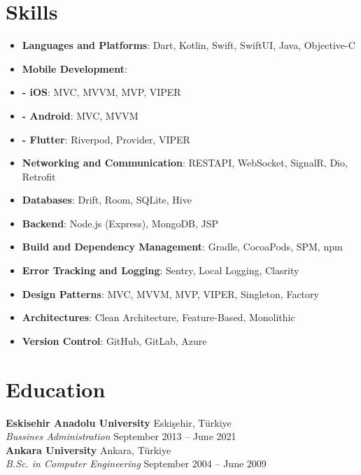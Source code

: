 \documentclass[11pt,a4paper]{extarticle}
\begin{document}
\section{Skills}
\begin{itemize}[leftmargin=*,noitemsep,topsep=0pt]
    \item \textbf{Languages and Platforms}: Dart, Kotlin, Swift, SwiftUI, Java, Objective-C
    \item \textbf{Mobile Development}: 
    \item \textbf{- iOS}: MVC, MVVM, MVP, VIPER
    \item \textbf{- Android}: MVC, MVVM
    \item \textbf{- Flutter}: Riverpod, Provider, VIPER
    \item \textbf{Networking and Communication}: RESTAPI, WebSocket, SignalR, Dio, Retrofit
    \item \textbf{Databases}: Drift, Room, SQLite, Hive
    \item \textbf{Backend}: Node.js (Express), MongoDB, JSP
    \item \textbf{Build and Dependency Management}: Gradle, CocoaPods, SPM, npm
    \item \textbf{Error Tracking and Logging}: Sentry, Local Logging, Clasrity
    \item \textbf{Design Patterns}: MVC, MVVM, MVP, VIPER, Singleton, Factory
    \item \textbf{Architectures}: Clean Architecture, Feature-Based, Monolithic
    \item \textbf{Version Control}: GitHub, GitLab, Azure
\end{itemize}

\section{Education}
\textbf{Eskisehir Anadolu University} \hfill Eskişehir, Türkiye\\
\textit{Bussines Administration} \hfill September 2013 -- June 2021\\
\textbf{Ankara University} \hfill Ankara, Türkiye\\
\textit{B.Sc. in Computer Engineering} \hfill September 2004 -- June 2009\\
\end{document}
